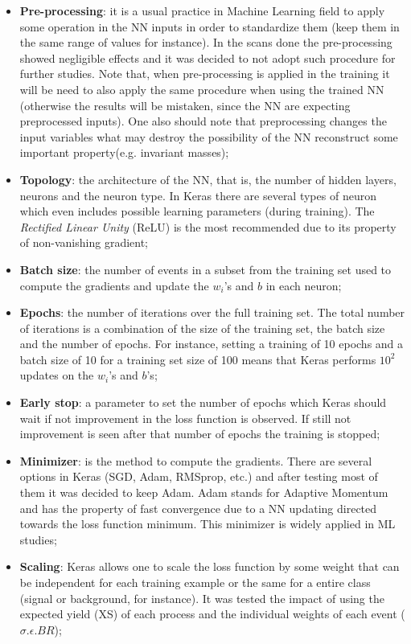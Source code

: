 \begin{itemize}
	\item \textbf{Pre-processing}: it is a usual practice in Machine Learning field to apply some operation in the NN inputs in order to standardize them (keep them in the same range of values for instance). In the scans done the pre-processing showed negligible effects and it was decided to not adopt such procedure for further studies. Note that, when pre-processing is applied in the training it will be need to also apply the same procedure when using the trained NN (otherwise the results will be mistaken, since the NN are expecting preprocessed inputs). One also should note that preprocessing changes the input variables what may destroy the possibility of the NN reconstruct some important property(e.g. invariant masses);
	\item \textbf{Topology}: the architecture of the NN, that is, the number of hidden layers, neurons and the neuron type. In Keras there are several types of neuron which even includes possible learning parameters (during training). The \textit{Rectified Linear Unity} (ReLU) is the most recommended due to its property of non-vanishing gradient;
	\item \textbf{Batch size}: the number of events in a subset from the training set used to compute the gradients and update the \textbf{$w_{i}$}'s and \textbf{$b$} in each neuron;
	\item \textbf{Epochs}: the number of iterations over the full training set. The total number of iterations is a combination of the size of the training set, the batch size and the number of epochs. For instance, setting a training of 10 epochs and a batch size of 10 for a training set size of 100 means that Keras performs $10^{2}$ updates on the \textbf{$w_{i}$}'s and \textbf{$b$}'s;
	\item \textbf{Early stop}: a parameter to set the number of epochs which Keras should wait if not improvement in the loss function is observed. If still not improvement is seen after that number of epochs the training is stopped;
	\item \textbf{Minimizer}: is the method to compute the gradients. There are several options in Keras (SGD, Adam, RMSprop, etc.) and after testing most of them it was decided to keep Adam. Adam stands for Adaptive Momentum and has the property of fast convergence due to a NN updating directed towards the loss function minimum. This minimizer is widely applied in ML studies;
	\item \textbf{Scaling}: Keras allows one to scale the loss function by some weight that can be independent for each training example or the same for a entire class (signal or background, for instance). It was tested the impact of using the expected yield (XS) of each process and the individual weights of each event ($\sigma.\epsilon.BR$);

\end{itemize}
